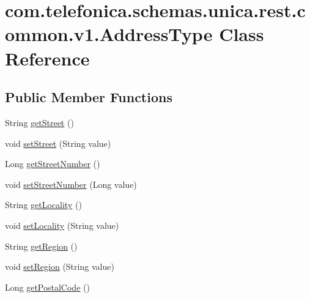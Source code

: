 \hypertarget{classcom_1_1telefonica_1_1schemas_1_1unica_1_1rest_1_1common_1_1v1_1_1AddressType}{
\section{com.telefonica.schemas.unica.rest.common.v1.AddressType Class Reference}
\label{classcom_1_1telefonica_1_1schemas_1_1unica_1_1rest_1_1common_1_1v1_1_1AddressType}
}
\subsection*{Public Member Functions}
\begin{DoxyCompactItemize}
\item 
String \hyperlink{classcom_1_1telefonica_1_1schemas_1_1unica_1_1rest_1_1common_1_1v1_1_1AddressType_a9b63d2ee45deac2a41b9203d576b5aa0}{getStreet} ()
\item 
void \hyperlink{classcom_1_1telefonica_1_1schemas_1_1unica_1_1rest_1_1common_1_1v1_1_1AddressType_a7946590433f660a536f12f941dfd34f1}{setStreet} (String value)
\item 
Long \hyperlink{classcom_1_1telefonica_1_1schemas_1_1unica_1_1rest_1_1common_1_1v1_1_1AddressType_ae50845ee7956144347032f3bf53b923b}{getStreetNumber} ()
\item 
void \hyperlink{classcom_1_1telefonica_1_1schemas_1_1unica_1_1rest_1_1common_1_1v1_1_1AddressType_a05fa42f58a20585b1d21e436bb2f0c07}{setStreetNumber} (Long value)
\item 
String \hyperlink{classcom_1_1telefonica_1_1schemas_1_1unica_1_1rest_1_1common_1_1v1_1_1AddressType_a6024590716869f520b34d1ad04dfabd4}{getLocality} ()
\item 
void \hyperlink{classcom_1_1telefonica_1_1schemas_1_1unica_1_1rest_1_1common_1_1v1_1_1AddressType_a3f80ff1751aad0aacdec9c43c62660d9}{setLocality} (String value)
\item 
String \hyperlink{classcom_1_1telefonica_1_1schemas_1_1unica_1_1rest_1_1common_1_1v1_1_1AddressType_ae59857ac9a1d093cce7309de15a13dc7}{getRegion} ()
\item 
void \hyperlink{classcom_1_1telefonica_1_1schemas_1_1unica_1_1rest_1_1common_1_1v1_1_1AddressType_abd569101bdbc47705f96fb48d0950005}{setRegion} (String value)
\item 
Long \hyperlink{classcom_1_1telefonica_1_1schemas_1_1unica_1_1rest_1_1common_1_1v1_1_1AddressType_afc75dcd5de7158bfb44eb53002d47dc1}{getPostalCode} ()

\end{DoxyCompactItemize}
